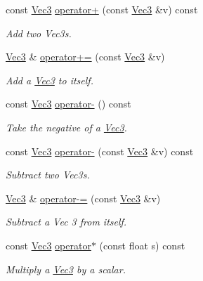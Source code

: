 \begin{DoxyCompactItemize}
\item 
const \hyperlink{struct_ori_engine_1_1_vec3}{Vec3} \hyperlink{struct_ori_engine_1_1_vec3_a68b3819fa6b6b9ddb2d6c1d75caa0d41}{operator+} (const \hyperlink{struct_ori_engine_1_1_vec3}{Vec3} \&v) const
\begin{DoxyCompactList}\small\item\em Add two Vec3s. \end{DoxyCompactList}\item 
\hyperlink{struct_ori_engine_1_1_vec3}{Vec3} \& \hyperlink{struct_ori_engine_1_1_vec3_a1f77d29a453dfdf1fc75290e2824b42e}{operator+=} (const \hyperlink{struct_ori_engine_1_1_vec3}{Vec3} \&v)
\begin{DoxyCompactList}\small\item\em Add a \hyperlink{struct_ori_engine_1_1_vec3}{Vec3} to itself. \end{DoxyCompactList}\item 
const \hyperlink{struct_ori_engine_1_1_vec3}{Vec3} \hyperlink{struct_ori_engine_1_1_vec3_a15bce489607090ec4bda56a1d5b0c0f1}{operator-\/} () const
\begin{DoxyCompactList}\small\item\em Take the negative of a \hyperlink{struct_ori_engine_1_1_vec3}{Vec3}. \end{DoxyCompactList}\item 
const \hyperlink{struct_ori_engine_1_1_vec3}{Vec3} \hyperlink{struct_ori_engine_1_1_vec3_a18dacfa9dfb456dd11e58a7be4f01e8d}{operator-\/} (const \hyperlink{struct_ori_engine_1_1_vec3}{Vec3} \&v) const
\begin{DoxyCompactList}\small\item\em Subtract two Vec3s. \end{DoxyCompactList}\item 
\hyperlink{struct_ori_engine_1_1_vec3}{Vec3} \& \hyperlink{struct_ori_engine_1_1_vec3_a5ced07421d0576122c0179517947039b}{operator-\/=} (const \hyperlink{struct_ori_engine_1_1_vec3}{Vec3} \&v)
\begin{DoxyCompactList}\small\item\em Subtract a Vec 3 from itself. \end{DoxyCompactList}\item 
const \hyperlink{struct_ori_engine_1_1_vec3}{Vec3} \hyperlink{struct_ori_engine_1_1_vec3_ac32d680353a0bdf43f6ab113834e1986}{operator$\ast$} (const float s) const
\begin{DoxyCompactList}\small\item\em Multiply a \hyperlink{struct_ori_engine_1_1_vec3}{Vec3} by a scalar. \end{DoxyCompactList}\item 

\end{DoxyCompactItemize}
